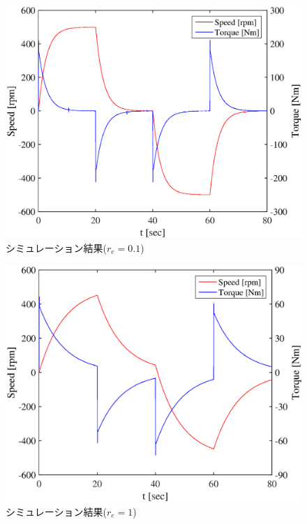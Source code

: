 \documentclass[a4paper,12pt]{jarticle}
\begin{document}
\begin{figure}[H]
 \begin{center}
 \hspace{-1.2cm}
  \includegraphics[scale=0.65]{../figure/eps/simout_3.eps}
  \caption{シミュレーション結果($ r_e = 0.1 $)}
  \label{sim3}
 \end{center}
\end{figure}

\begin{figure}[H]
 \begin{center}
 \hspace{-1.5cm}
  \includegraphics[scale=0.65]{../figure/eps/simout_4.eps}
  \caption{シミュレーション結果($ r_e = 1 $)}
  \label{sim4}
 \end{center}
\end{figure}
\end{document}
